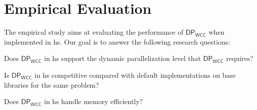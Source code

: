 \documentclass[preprint]{elsarticle}
\newcommand{\dpwcc}{\mathsf{DP_{WCC}}}
\begin{document}

\section{Empirical Evaluation}\label{sec:evaluation}
The empirical study aims at evaluating the performance of $\dpwcc$ when implemented in \acrshort{hs}. 
Our goal is to answer the following research questions: 

\begin{inparaenum}[\bf {\bf RQ}1\upshape)]
\label{res:question}
    \item Does $\dpwcc$ in \acrshort{hs} support the dynamic parallelization level that $\dpwcc$ requires?
    \item Is $\dpwcc$ in \acrshort{hs} competitive compared with default implementations on base libraries for the same problem?
    \item Does $\dpwcc$ in \acrshort{hs} handle memory efficiently?
\end{inparaenum}
\end{document}

